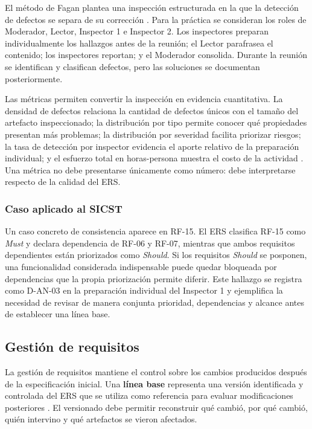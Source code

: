\documentclass[12pt,a4paper]{article}
\begin{document}
El método de Fagan plantea una inspección estructurada en la que la detección de defectos se separa de su corrección \cite{r9}. Para la práctica se consideran los roles de Moderador, Lector, Inspector 1 e Inspector 2. Los inspectores preparan individualmente los hallazgos antes de la reunión; el Lector parafrasea el contenido; los inspectores reportan; y el Moderador consolida. Durante la reunión se identifican y clasifican defectos, pero las soluciones se documentan posteriormente.

Las métricas permiten convertir la inspección en evidencia cuantitativa. La densidad de defectos relaciona la cantidad de defectos únicos con el tamaño del artefacto inspeccionado; la distribución por tipo permite conocer qué propiedades presentan más problemas; la distribución por severidad facilita priorizar riesgos; la tasa de detección por inspector evidencia el aporte relativo de la preparación individual; y el esfuerzo total en horas-persona muestra el costo de la actividad \cite{r9,r6}. Una métrica no debe presentarse únicamente como número: debe interpretarse respecto de la calidad del ERS.

\subsubsection{Caso aplicado al SICST}

Un caso concreto de consistencia aparece en RF-15. El ERS clasifica RF-15 como \textit{Must} y declara dependencia de RF-06 y RF-07, mientras que ambos requisitos dependientes están priorizados como \textit{Should}. Si los requisitos \textit{Should} se posponen, una funcionalidad considerada indispensable puede quedar bloqueada por dependencias que la propia priorización permite diferir. Este hallazgo se registra como D-AN-03 en la preparación individual del Inspector 1 y ejemplifica la necesidad de revisar de manera conjunta prioridad, dependencias y alcance antes de establecer una línea base.

\subsection{Gestión de requisitos}

La gestión de requisitos mantiene el control sobre los cambios producidos después de la especificación inicial. Una \textbf{línea base} representa una versión identificada y controlada del ERS que se utiliza como referencia para evaluar modificaciones posteriores \cite{r2,r3}. El versionado debe permitir reconstruir qué cambió, por qué cambió, quién intervino y qué artefactos se vieron afectados.
\end{document}
